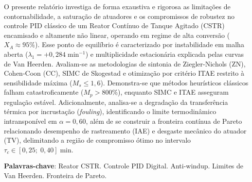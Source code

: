 \documentclass[
	12pt,
	oneside,
	a4paper,
	chapter=TITLE,
	section=TITLE,
	english,
	brazilian
]{abntex2}
\begin{document}
\frenchspacing


\imprimircapa
\imprimirfolhaderosto

\begin{resumo}
O presente relatório investiga de forma exaustiva e rigorosa as limitações de contornabilidade, a saturação de atuadores e os compromissos de robustez no controle PID clássico de um Reator Contínuo de Tanque Agitado (CSTR) encamisado e altamente não linear, operando em regime de alta conversão ($X_A \approx 95\%$). Esse ponto de equilíbrio é caracterizado por instabilidade em malha aberta ($\lambda_1 = +0{,}284\;\si{\minute^{-1}}$) e multiplicidade estacionária explicada pelas curvas de Van Heerden. Avaliam-se as metodologias de sintonia de Ziegler-Nichols (ZN), Cohen-Coon (CC), SIMC de Skogestad e otimização por critério ITAE restrito à sensibilidade máxima ($M_s \leq 1{,}6$). Demonstra-se que métodos heurísticos clássicos falham catastroficamente ($M_p > 800\%$), enquanto SIMC e ITAE asseguram regulação estável. Adicionalmente, analisa-se a degradação da transferência térmica por incrustação (\textit{fouling}), identificando o limite termodinâmico intransponível em $\alpha = 0{,}60$, além de se construir a fronteira contínua de Pareto relacionando desempenho de rastreamento (IAE) e desgaste mecânico do atuador (TV), delimitando a região de compromisso ótimo no intervalo $\tau_c \in [0{,}25;\; 0{,}40]\;\si{\minute}$.

\vspace{\onelineskip}
\noindent
\textbf{Palavras-chave}: Reator CSTR. Controle PID Digital. Anti-windup. Limites de Van Heerden. Fronteira de Pareto.
\end{resumo}
\end{document}
